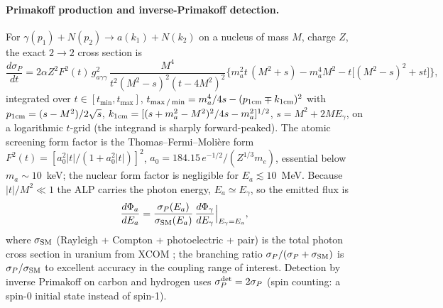 \documentclass[aps,prd,superscriptaddress,nofootinbib,longbibliography,notitlepage,11pt]{revtex4-2}
\begin{document}
\paragraph{Primakoff production and inverse-Primakoff detection.}
For $\gamma(p_1)+N(p_2)\to a(k_1)+N(k_2)$ on a nucleus of mass $M$, charge $Z$, the exact
$2\to2$ cross section \cite{Aloni:2019ruo,AristizabalSierra:2020rom} is
\begin{equation}
\frac{d\sigma_P}{dt}=2\alpha Z^2F^2(t)\,g_{a\gamma\gamma}^2\,
\frac{M^4}{t^2(M^2-s)^2(t-4M^2)^2}
\Big\{m_a^2t\,(M^2+s)-m_a^4M^2-t\big[(M^2-s)^2+st\big]\Big\},
\label{eq:primakoff}
\end{equation}
integrated over $t\in[t_{\min},t_{\max}]$, $t_{\max/\min}=m_a^4/4s-(p_{1\rm cm}\mp k_{1\rm cm})^2$
with $p_{1\rm cm}=(s-M^2)/2\sqrt s$, $k_{1\rm cm}=[(s+m_a^2-M^2)^2/4s-m_a^2]^{1/2}$,
$s=M^2+2ME_\gamma$, on a logarithmic $t$-grid (the integrand is sharply forward-peaked).
The atomic screening form factor is the Thomas--Fermi--Moli\`ere form
$F^2(t)=[a_0^2|t|/(1+a_0^2|t|)]^2$, $a_0=184.15\,e^{-1/2}/(Z^{1/3}m_e)$, essential below
$m_a\sim10$~keV; the nuclear form factor is negligible for $E_a\lesssim10$~MeV.  Because
$|t|/M^2\ll1$ the ALP carries the photon energy, $E_a\simeq E_\gamma$, so the emitted flux is
\begin{equation}
\frac{d\Phi_a}{dE_a}=\frac{\sigma_P(E_a)}{\sigma_{\rm SM}(E_a)}\,
\frac{d\Phi_\gamma}{dE_\gamma}\Big|_{E_\gamma=E_a},
\label{eq:alpflux}
\end{equation}
where $\sigma_{\rm SM}$ (Rayleigh + Compton + photoelectric + pair) is the total photon
cross section in uranium from XCOM \cite{XCOM}; the branching ratio
$\sigma_P/(\sigma_P+\sigma_{\rm SM})$ is $\sigma_P/\sigma_{\rm SM}$ to excellent accuracy in
the coupling range of interest.  Detection by inverse Primakoff on carbon and hydrogen uses
$\sigma_P^{\rm det}=2\sigma_P$ (spin counting: a spin-0 initial state instead of spin-1).
\end{document}
